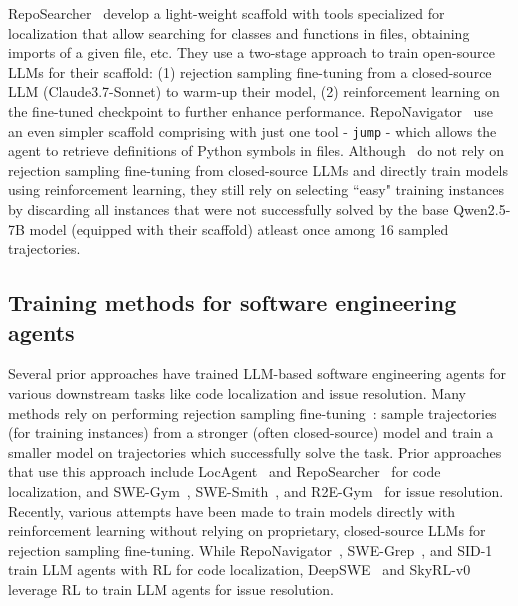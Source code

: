 RepoSearcher~\citep{ma2025toolintegratedreinforcementlearningrepo} develop a light-weight scaffold with tools specialized for localization that allow searching for classes and functions in files, obtaining imports of a given file, etc. They use a two-stage approach to train open-source LLMs for their scaffold: (1) rejection sampling fine-tuning from a closed-source LLM (Claude3.7-Sonnet) to warm-up their model, (2) reinforcement learning on the fine-tuned checkpoint to further enhance performance. RepoNavigator~\citep{zhang2025one} use an even simpler scaffold comprising with just one tool - \texttt{jump} - which allows the agent to retrieve definitions of Python symbols in files. Although~\citet{zhang2025one} do not rely on rejection sampling fine-tuning from closed-source LLMs and directly train models using reinforcement learning, they still rely on selecting ``easy" training instances by discarding all instances that were not successfully solved by the base Qwen2.5-7B model (equipped with their scaffold) atleast once among 16 sampled trajectories. 

\subsection{Training methods for software engineering agents}
Several prior approaches have trained LLM-based software engineering agents for various downstream tasks like code localization and issue resolution. Many methods rely on performing rejection sampling fine-tuning~\citep{yuan2023scalingrelationshiplearningmathematical}: sample trajectories (for training instances) from a stronger (often closed-source) model and train a smaller model on trajectories which successfully solve the task. Prior approaches that use this approach include LocAgent~\citep{chen-etal-2025-locagent} and RepoSearcher~\citep{ma2025toolintegratedreinforcementlearningrepo} for code localization, and SWE-Gym~\citep{pan2025trainingsoftwareengineeringagents}, SWE-Smith~\citep{yang2025swesmithscalingdatasoftware}, and R2E-Gym~\citep{jain2025r2egymproceduralenvironmentshybrid} for issue resolution. Recently, various attempts have been made to train models directly with reinforcement learning without relying on proprietary, closed-source LLMs for rejection sampling fine-tuning. While RepoNavigator~\citep{zhang2025one}, SWE-Grep~\citep{cognition2025swegrep}, and SID-1~\citep{sid2025preview} train LLM agents with RL for code localization, DeepSWE~\citep{luo2025deepswe} and SkyRL-v0~\citep{cao2025skyrl} leverage RL to train LLM agents for issue resolution.

